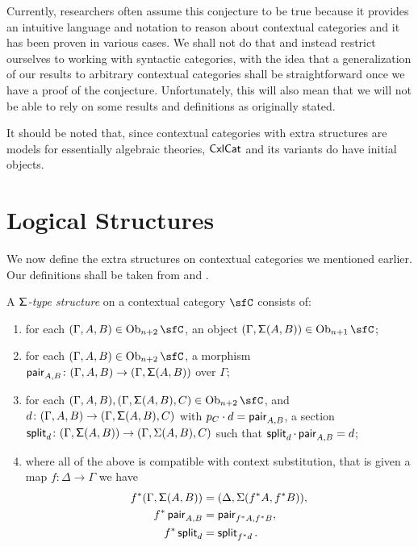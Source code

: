 Currently, researchers often assume this conjecture to be true because it
provides an intuitive language and notation to reason about contextual
categories and it has been proven in various cases. We shall not do that
and instead restrict ourselves to working with syntactic categories, with the
idea that a generalization of our results to arbitrary contextual categories
shall be straightforward once we have a proof of the conjecture. Unfortunately,
this will also mean that we will not be able to rely on some results and
definitions as originally stated.

It should be noted that, since contextual categories with extra structures are
models for essentially algebraic theories, $\operatorname{\mathsf{CxlCat}}$ and its variants do have
initial objects.

\section{Logical Structures}

We now define the extra structures on contextual categories we mentioned
earlier. Our definitions shall be taken from \cite{KL12} and \cite{KL18}.

\begin{defn}
  A \emph{$\operatorname{\mathsf{\Sigma}}$-type structure} on a contextual category $\sfC$ consists of:
  \begin{enumerate}
    \item for each $(\Gamma,A,B)\in\Ob_{n+2}\sfC$, an object
      $(\Gamma,\Sigmas(A,B))\in\Ob_{n+1}\sfC$;
    \item for each $(\Gamma,A,B)\in\Ob_{n+2}\sfC$, a morphism $\operatorname{\mathsf{pair}}_{A,B}\colon
      (\Gamma,A,B)\rightarrow(\Gamma,\operatorname{\mathsf{\Sigma}}(A,B))$ over $\Gamma$;
    \item for each $(\Gamma,A,B),(\Gamma,\Sigmas(A,B),C)\in\Ob_{n+2}\sfC$, and
      $d\colon(\Gamma,A,B)\rightarrow(\Gamma,\operatorname{\mathsf{\Sigma}}(A,B),C)$ with $p_C\cdot
      d=\operatorname{\mathsf{pair}}_{A,B}$, a section
      $\operatorname{\mathsf{split}}_d\colon(\Gamma,\operatorname{\mathsf{\Sigma}}(A,B))\rightarrow(\Gamma,\Sigma(A,B),C)$ such
      that $\operatorname{\mathsf{split}}_d\cdot\operatorname{\mathsf{pair}}_{A,B}=d$;
    \item where all of the above is compatible with context substitution, that
      is given a map $f\colon\Delta\rightarrow\Gamma$ we have
      \begin{align*}
        f^*(\Gamma,\operatorname{\mathsf{\Sigma}}(A,B)) &=(\Delta,\Sigma(f^*A,f^*B)), \\
        f^*\operatorname{\mathsf{pair}}_{A,B} &=\operatorname{\mathsf{pair}}_{f^*A,f^*B}, \\
        f^*\operatorname{\mathsf{split}}_d &=\operatorname{\mathsf{split}}_{f^*d}.
      \end{align*}
  \end{enumerate}
\end{defn}

